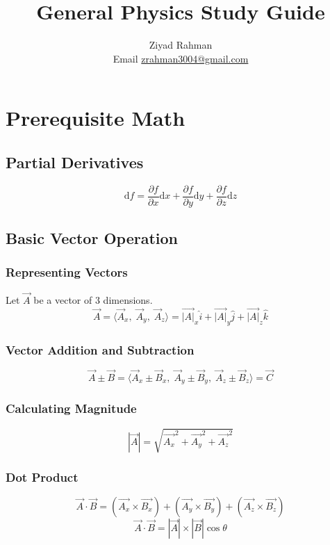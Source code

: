 \documentclass{article}
\title{General Physics Study Guide}
\author{Ziyad Rahman \\ Email \href{zrahman3004@gmail.com}{zrahman3004@gmail.com} }
\date{}
\begin{document}
\maketitle

\tableofcontents
\newpage

\section{Prerequisite Math}
\subsection{Partial Derivatives}

\begin{equation}
    \mathrm{d}f = \frac{\partial f}{\partial x} \mathrm{d}x + \frac{\partial f}{\partial y} \mathrm{d}y + \frac{\partial f}{\partial z} \mathrm{d}z
\end{equation}
\subsection{Basic Vector Operation}
\subsubsection{Representing Vectors}
Let $\vec{A}$ be a vector of 3 dimensions.
\begin{equation}
    \vec{A} = \langle \vec{A}_x, \; \vec{A}_y, \; \vec{A}_z \rangle = \vec{|A|}_x \hat{i} + \vec{|A|}_y \hat{j} + \vec{|A|}_z \hat{k}
\end{equation}

\subsubsection{Vector Addition and Subtraction}
\begin{equation}
    \vec{A} \pm \vec{B} = \langle \vec{A}_x \pm \vec{B}_x, \; \vec{A}_y \pm \vec{B}_y, \; \vec{A}_z \pm \vec{B}_z \rangle = \vec{C}
\end{equation}

\subsubsection{Calculating Magnitude}
\begin{equation}
    |\vec{A}| = \sqrt{\vec{A_x}^2 + \vec{A_y}^2 + \vec{A_z}^2} 
\end{equation}

\subsubsection{Dot Product}
\begin{equation}
    \vec{A} \cdot \vec{B} = (\vec{A_x} \times \vec{B_x}) + (\vec{A_y} \times \vec{B_y}) + (\vec{A_z} \times \vec{B_z})
\end{equation}
\begin{equation}
    \vec{A} \cdot \vec{B} = |\vec{A}| \times |\vec{B}|\cos{\theta}
\end{equation}
\end{document}

